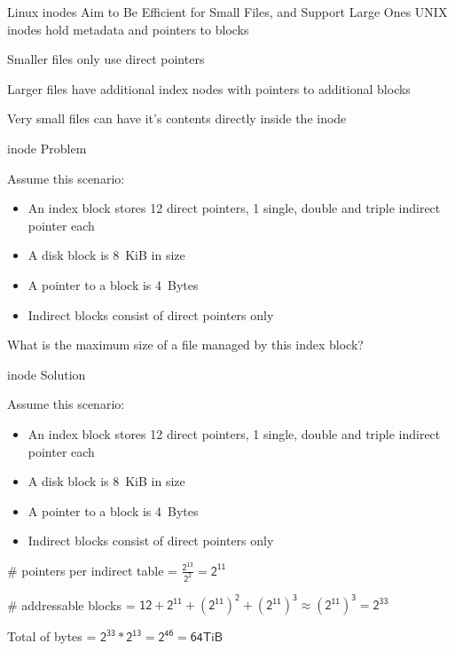   \begin{frame}{Linux inodes Aim to Be Efficient for Small Files, and Support Large Ones}
    UNIX inodes hold metadata and pointers to blocks

    \vspace{2em}

    Smaller files only use direct pointers

    \vspace{2em}

    Larger files have additional index nodes with pointers to additional blocks

    \vspace{2em}

    Very small files can have it's contents directly inside the inode
  \end{frame}

  \begin{frame}{inode Problem}
    
    Assume this scenario:
    \begin{itemize}
      \item An index block stores 12 direct pointers, 1 single, double and triple indirect pointer each
      \item A disk block is 8~KiB in size
      \item A pointer to a block is 4~Bytes
      \item Indirect blocks consist of direct pointers only
    \end{itemize}


    \vspace{2em}

    What is the maximum size of a file managed by this index block?
  \end{frame}

  \begin{frame}{inode Solution}
    
    Assume this scenario:
    \begin{itemize}
      \item An index block stores 12 direct pointers, 1 single, double and triple indirect pointer each
      \item A disk block is 8~KiB in size
      \item A pointer to a block is 4~Bytes
      \item Indirect blocks consist of direct pointers only
    \end{itemize}

    \vspace{2em}

    \# pointers per indirect table = $\mathsf{\frac{2^{13}}{2^2} = 2^{11}}$

    \# addressable blocks = $\mathsf{12 + 2^{11} + (2^{11})^2 + (2^{11})^3 \approx (2^{11})^3 = 2^{33}}$

    Total of bytes = $\mathsf{2^{33} * 2^{13} = 2^{46} = 64 TiB}$
  \end{frame}

